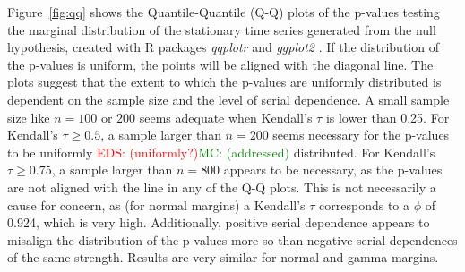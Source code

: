 \documentclass[APA,Times1COL]{WileyNJDv5} %
\newcommand{\eds}[1]{\textcolor{red}{EDS: (#1)}}
\newcommand{\mc}[1]{\textcolor{green}{MC: (#1)}}
\begin{document}
Figure~\ref{fig:qq} shows the Quantile-Quantile (Q-Q)
plots of the p-values testing the marginal distribution of the stationary time
series generated from the null hypothesis, created with R packages
\textsl{qqplotr} and \textsl{ggplot2} \citep{qqplotr, ggplot2}. If the
distribution of the p-values is uniform, the points will be aligned with the
diagonal line. The plots suggest that the extent to which the p-values are
uniformly distributed is dependent on the sample size and the level of serial 
dependence.
A small sample size like $n = 100$ or $200$ seems adequate when Kendall's
$\tau$ is lower than 0.25. For Kendall's $\tau \geq 0.5$, a sample larger than
$n = 200$ seems necessary for the p-values to be uniformly
\eds{uniformly?}\mc{addressed} distributed. For
Kendall's $\tau \geq 0.75$, a sample larger than $n = 800$ appears to be 
necessary, as the p-values are not aligned with the line in any of the Q-Q 
plots. This
is not necessarily a cause for concern, as (for normal margins)
a Kendall's $\tau$ corresponds to
a $\phi$ of 0.924, which is very high.
Additionally, positive serial dependence appears to misalign the distribution
of the p-values more so than negative serial dependences of the same strength.
Results are very similar for normal and gamma margins.
\end{document}
